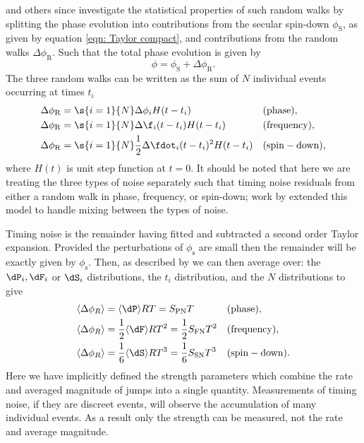 \citet{Boynton1972} and others since investigate the statistical properties of
such random walks by splitting the phase evolution into contributions from the
secular spin-down $\phi_{\mathrm{S}}$, as given by equation \eqref{eqn: Taylor
compact}, and contributions from the random walks $\Delta\phi_\mathrm{R}$. Such
that the total phase evolution is given by
\begin{equation}
    \phi = \phi_{\mathrm{S}} + \Delta\phi_{\mathrm{R}}.
\end{equation}
The three random walks can be written as the sum of $N$ individual events
occurring at times $t_{i}$
\begin{align}
    \Delta\phi_{\mathrm{R}} & = \s{i=1}{N}\Delta\phi_{i} H(t - t_{i})
     && \mathrm{(phase),} \\
    \Delta\phi_{\mathrm{R}} & = \s{i=1}{N}\Delta\f_{i} (t-t_{i})H(t - t_{i})
     && \mathrm{(frequency),} \\
    \Delta\phi_{\mathrm{R}} & = \s{i=1}{N}\frac{1}{2}\Delta\fdot_{i} (t-t_{i})^{2}H(t - t_{i})
     && \mathrm{(spin-down),}
\end{align}
where $H(t)$ is unit step function at $t=0$. It should be noted that here we are
treating the three types of noise separately such that timing noise residuals
from either a random walk in phase, frequency, or spin-down; work by \citet{Cordes1980}
extended this model to handle mixing between the types of noise.

Timing noise is the remainder having
fitted and subtracted a second order Taylor expansion. Provided the perturbations
of $\phi_{\mathrm{s}}$ are small then the remainder will be exactly given by
$\phi_{\mathrm{s}}$. Then, as described by \citet{Boynton1972} we can then
average over: the $\dP_{i}, \dF_{i}$ or $\dS_{i}$
distributions, the $t_{i}$ distribution, and the $N$ distributions to give
\begin{align}
    \langle \Delta\phi_{R} \rangle & = \langle \dP \rangle R T
    = S_{\mathrm{PN}}T && \mathrm{(phase),} \\
    \langle \Delta\phi_{R} \rangle & = \frac{1}{2}\langle \dF \rangle R T^{2}
    = \frac{1}{2}S_{\mathrm{FN}}T^{2} && \mathrm{(frequency),} \\
    \langle \Delta\phi_{R} \rangle & = \frac{1}{6}\langle \dS \rangle R T^{3}
    = \frac{1}{6}S_{\mathrm{SN}}T^{3} && \mathrm{(spin-down).}
\end{align}
Here we have implicitly defined the strength parameters which combine the rate
and averaged magnitude of jumps into a single quantity. Measurements of timing
noise, if they are discreet events, will observe the accumulation of many
individual events. As a result only the strength can be
measured, not the rate and average magnitude.

